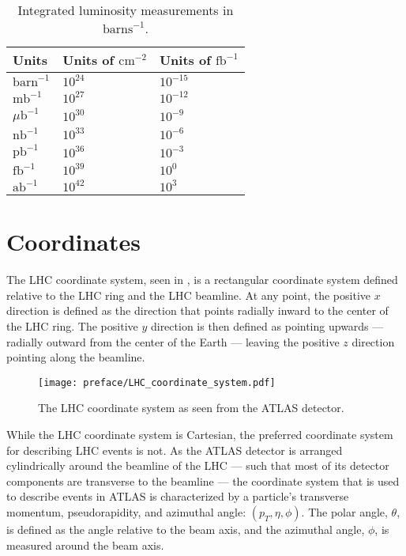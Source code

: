 \begin{table}[htpb]
 \centering
 \caption{Integrated luminosity measurements in $\text{barns}^{-1}$.}
 \begin{tabular}{@{}lll@{}} \toprule
  Units                & Units of $\textrm{cm}^{-2}$ & Units of $\textrm{fb}^{-1}$ \\ \midrule
  $\textrm{barn}^{-1}$ & $10^{24}$                   & $10^{-15}$                  \\
  $\textrm{mb}^{-1}$   & $10^{27}$                   & $10^{-12}$                  \\
  $\mu\textrm{b}^{-1}$ & $10^{30}$                   & $10^{-9}$                   \\
  $\textrm{nb}^{-1}$   & $10^{33}$                   & $10^{-6}$                   \\
  $\textrm{pb}^{-1}$   & $10^{36}$                   & $10^{-3}$                   \\
  $\textrm{fb}^{-1}$   & $10^{39}$                   & $10^{0}$                    \\
  $\textrm{ab}^{-1}$   & $10^{42}$                   & $10^{3}$                    \\
  \bottomrule
 \end{tabular}\label{table:Luminosity}%
\end{table}

\clearpage
\section{Coordinates}\label{section:coordinates}

The LHC coordinate system, seen in , is a rectangular coordinate system defined relative to the LHC ring and the LHC beamline.
At any point, the positive $x$ direction is defined as the direction that points radially inward to the center of the LHC ring.
The positive $y$ direction is then defined as pointing upwards --- radially outward from the center of the Earth --- leaving the positive $z$ direction pointing along the beamline.

\begin{figure}[htbp]
 \centering
 \texttt{[image: preface/LHC\_coordinate\_system.pdf]}
 \caption{The LHC coordinate system as seen from the ATLAS detector.}
 \label{fig:LHC_coordinate_system}
\end{figure}

While the LHC coordinate system is Cartesian, the preferred coordinate system for describing LHC events is not.
As the ATLAS detector is arranged cylindrically around the beamline of the LHC --- such that most of its detector components are transverse to the beamline --- the coordinate system that is used to describe events in ATLAS is characterized by a particle's transverse momentum, pseudorapidity, and azimuthal angle: $\left(p_T, \eta, \phi\right)$.
The polar angle, $\theta$, is defined as the angle relative to the beam axis, and the azimuthal angle, $\phi$, is measured around the beam axis.

